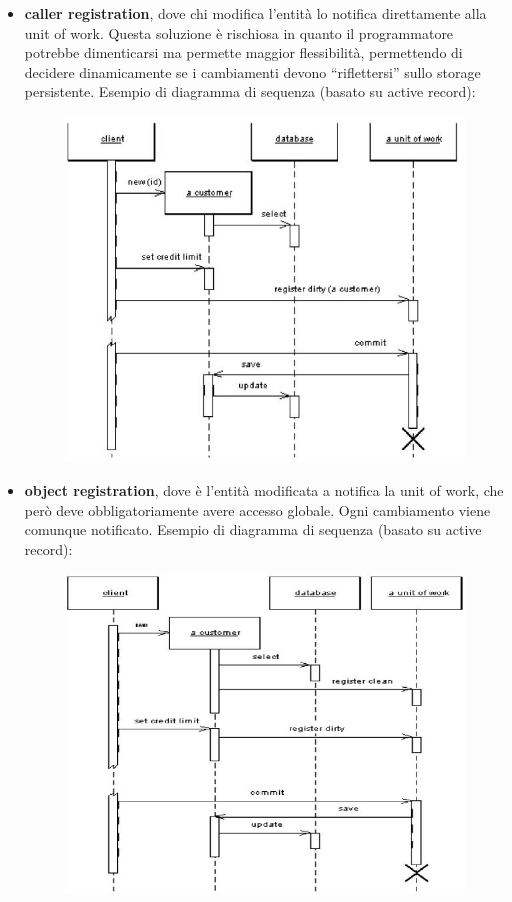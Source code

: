 \documentclass[a4paper,12pt, oneside]{book}
\begin{document}
\begin{itemize}
  \item \textbf{caller registration}, dove chi modifica l'entità lo notifica
  direttamente alla unit of work. Questa soluzione è rischiosa in quanto il
  programmatore potrebbe dimenticarsi ma permette maggior flessibilità,
  permettendo di decidere dinamicamente se i cambiamenti devono ``riflettersi''
  sullo storage persistente. Esempio di diagramma di sequenza (basato su active
  record):
  \begin{figure}[H]
    \centering
    \includegraphics[scale = 0.35]{img/cr.jpg}
  \end{figure}
  \item \textbf{object registration}, dove è l'entità modificata a notifica la
  unit of work, che però deve obbligatoriamente avere accesso globale. Ogni
  cambiamento viene comunque notificato. Esempio di diagramma di sequenza
  (basato su active record):
  \begin{figure}[H]
    \centering
    \includegraphics[scale = 0.35]{img/or.jpg}

\end{figure}
\end{itemize}
\end{document}
